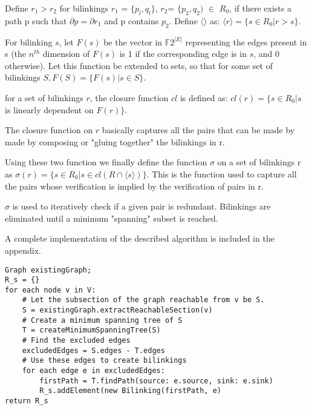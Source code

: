 \documentclass[sigplan,review,anonymous]{acmart}
\begin{document}
Define $r_1>r_2$ for bilinkings $r_1$ = $\{p_l,q_l\}$, $r_2$= $\{p_2, q_2)$ $\in$ $R_0$, if there exists a path p such that $\partial p=\partial r_1$ and p contains $p_2$.
Define $\langle\rangle$ as:
$\langle r \rangle = \{ s\in R_0| r>s\}$.

For bilinking $s$, let $F(s)$ be the vector in $\mathbb{F}2^{|E|}$ representing the edges present in s (the $n^{th}$ dimension of $F(s)$ is 1 if the corresponding edge is in $s$, and 0 otherwise). Let this function be extended to sets, so that for some set of bilinkings $S, F(S) = \{ F(s) | s\in S \}$.

for a set of bilinkings $r$, the closure function $cl$ is defined as:
$cl(r) = \{ s\in R_0| s$ is linearly dependent on $F(r) \}$.

The closure function on $r$ basically captures all the pairs that can be made by made by composing or "gluing together" the bilinkings in r. 

Using these two function we finally define the function $\sigma$ on a set of bilinkings r as
$\sigma(r) = \{s \in R_0 | s\in cl(R\cap \langle s \rangle) \}$.
This is the function used to capture all the pairs whose verification is implied by the verification of pairs in r.

$\sigma$ is used to iteratively check if a given pair is redundant. Bilinkings are eliminated until a minimum "spanning" subset is reached.

A complete implementation of the described algorithm is included in the appendix.

\begin{verbatim}
Graph existingGraph;
R_s = {}
for each node v in V:
    # Let the subsection of the graph reachable from v be S.
    S = existingGraph.extractReachableSection(v)
    # Create a minimum spanning tree of S
    T = createMinimumSpanningTree(S)
    # Find the excluded edges
    excludedEdges = S.edges - T.edges
    # Use these edges to create bilinkings
    for each edge e in excludedEdges:
        firstPath = T.findPath(source: e.source, sink: e.sink)
        R_s.addElement(new Bilinking(firstPath, e)
return R_s
\end{verbatim}
\end{document}
